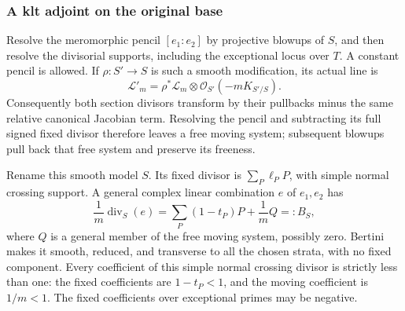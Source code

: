 \documentclass[11pt,letterpaper]{article}
\newcommand{\OO}{\mathcal{O}}
\DeclareMathOperator{\divisor}{div}
\theoremstyle{definition}
\theoremstyle{remark}
\begin{document}
\subsubsection{A klt adjoint on the original base}

Resolve the meromorphic pencil \([e_1:e_2]\) by projective blowups
of \(S\), and then resolve the divisorial supports, including the
exceptional locus over \(T\). A constant pencil is allowed. If
\(\rho:S'\to S\) is such a smooth modification, its actual line is
\begin{equation}\label{pos:base-canonical-transform}
 \mathcal L'_m
 =\rho^*\mathcal L_m\otimes\OO_{S'}(-mK_{S'/S}).
\end{equation}
Consequently both section divisors transform by their pullbacks minus
the same relative canonical Jacobian term. Resolving the pencil and
subtracting its full signed fixed divisor therefore leaves a free
moving system; subsequent blowups pull back that free system and
preserve its freeness.

Rename this smooth model \(S\). Its fixed divisor is
\(\sum_P\ell_PP\), with simple normal crossing support. A general
complex linear combination \(e\) of \(e_1,e_2\) has
\begin{equation}\label{pos:crepant-boundary-upstairs}
 \frac1m\divisor_S(e)
 =\sum_P(1-t_P)P+\frac1mQ=:B_S,
\end{equation}
where \(Q\) is a general member of the free moving system, possibly
zero. Bertini makes it smooth, reduced, and transverse to all the
chosen strata, with no fixed component. Every coefficient of this
simple normal crossing divisor is strictly less than one: the fixed
coefficients are \(1-t_P<1\), and the moving coefficient is
\(1/m<1\). The fixed coefficients over exceptional primes may be
negative.
\end{document}

